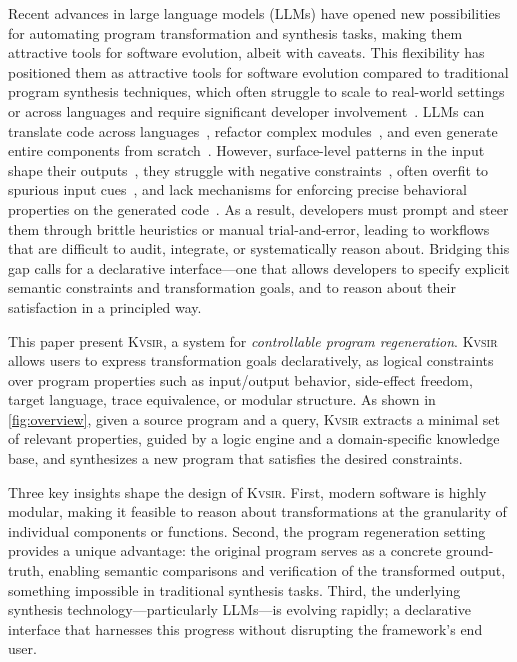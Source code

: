 \documentclass[noacm,sigplan,review]{acmart}
\newcommand{\sys}{{\scshape Kv{\textalpha}sir}\xspace}
\begin{document}
Recent advances in large language models (LLMs) have opened new possibilities for automating program transformation and synthesis tasks, making them attractive tools for software evolution, albeit with caveats.
This flexibility has positioned them as attractive tools for software evolution
compared to traditional program synthesis techniques, which often struggle
to scale to real-world settings or across languages and require significant developer involvement~\cite{reynolds2019syguscomp,leino2016dafny,wu2023programming,dynamoth2016,cambronero2019active}.
LLMs can translate code across languages~\cite{ou2025enhancingllmbasedcodetranslation},
refactor complex modules~\cite{ziftci2025migrating},
and even generate entire components from scratch~\cite{huynh2025largelanguagemodelscode}.
However, surface-level patterns in the input shape their outputs~\cite{yang2025evaluatinggeneralizationcapabilitieslarge},
they struggle with negative constraints~\cite{hwang2024thinkpinkelephant,jiang2024llmsdreamelephantswhen},
often overfit to spurious input cues~\cite{xu2023llmfoolitselfpromptbased, wu2023deceptpromptexploitingllmdrivencode},
and lack mechanisms for enforcing precise behavioral properties on the generated code~\cite{roh2025breakthechainreasoningfailuresllms}.
As a result, developers must prompt and steer them through brittle heuristics or manual trial-and-error, leading to workflows that are difficult to audit, integrate, or systematically reason about.
Bridging this gap calls for a declarative interface---one that allows developers to specify explicit semantic constraints and transformation goals, and to reason about their satisfaction in a principled way.

This paper present \sys, a system for \emph{controllable program regeneration}.
\sys allows users
to express transformation goals declaratively, as logical constraints over
program properties such as input/output behavior, side-effect freedom, target
language, trace equivalence, or modular structure.
As shown in \cref{fig:overview}, given a source program and
a query, \sys extracts a minimal set of relevant properties, guided by a
logic engine and a domain-specific knowledge base, and synthesizes a new
program that satisfies the desired constraints.

Three key insights shape the design of \sys.
First, modern software is highly modular, making it feasible to reason about transformations at the granularity of individual components or functions.
Second, the program regeneration setting provides a unique advantage: the original program serves as a concrete ground-truth, enabling semantic comparisons and verification of the transformed output, something impossible in traditional synthesis tasks.
Third, the underlying synthesis technology---particularly LLMs---is evolving rapidly; a declarative interface that harnesses this progress without disrupting the framework's end user.
\end{document}
